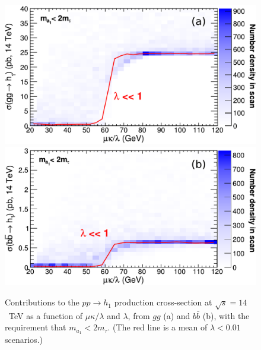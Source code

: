 \documentclass[aps,prl,twocolumn,nofootinbib,superscriptaddress]{revtex4}
\begin{document}
\begin{figure}[htb]
\includegraphics[width=0.48\linewidth]{plots/crosssec_vs_mukoverl_gg}
\hfill
\includegraphics[width=0.48\linewidth]{plots/crosssec_vs_mukoverl_bb}

\caption{Contributions to the $pp \to h_1$ production cross-section at
  $\sqrt{s}=14$~TeV as a function of $\mu\kappa/\lambda$ and
  $\lambda$, from $gg$ (a) and $b\bar{b}$ (b), with the requirement
  that $m_{a_1} < 2m_\tau$.  (The red line is a mean of $\lambda <
  0.01$ scenarios.)
  \label{fig:sm_mukoverl2}}
\end{figure}
\end{document}
